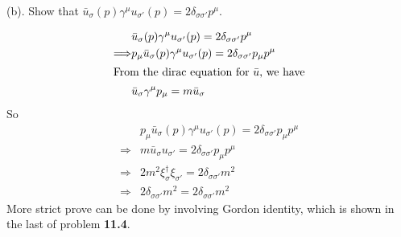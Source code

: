\documentclass{article}
\newcommand{\gm}{\gamma^{\mu}}
\newcommand{\s}{\sigma}
\begin{document}
(b). Show that $\bar u_{\s}(p)\gm u_{\s'}(p)=2\delta_{\s\s'}p^{\mu}$.

\begin{align*}
  &\bar u_{\s}(p)\gm u_{\s'}(p)=2\delta_{\s\s'}p^{\mu}\\
  \Longrightarrow &p_{\mu}\bar u_{\s}(p)\gm u_{\s'}(p)=2\delta_{\s\s'}p_{\mu}p^{\mu}\\
  \intertext{From the dirac equation for $\bar u$, we have} &\bar u_{\s}\gm p_{\mu}=m\bar u_{\s}
\end{align*}
So
\begin{align*}
  &p_{\mu}\bar u_{\s}(p)\gm u_{\s'}(p)=2\delta_{\s\s'}p_{\mu}p^{\mu}\\
  \Longrightarrow &m\bar u_{\s}u_{\s'}=2\delta_{\s\s'}p_{\mu}p^{\mu}\\
  \Longrightarrow &2m^2\xi_{\s}^{\dagger}\xi_{\s'}=2\delta_{\s\s'}m^2\\
  \Longrightarrow&2\delta_{\s\s'}m^2=2\delta_{\s\s'}m^2
\end{align*}
More strict prove can be done by involving Gordon identity, which is shown in the last of problem {\bf11.4}.
\end{document}
